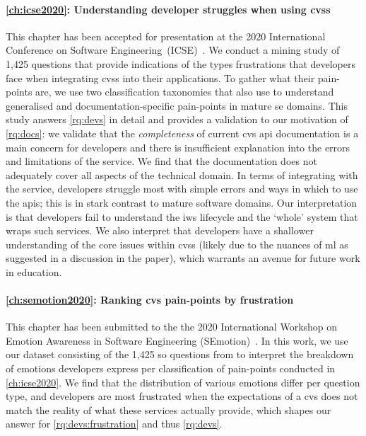 \paragraph{\cref{ch:icse2020}: Understanding developer struggles when using \glspl{cvs}} This chapter has been accepted for presentation at the 2020 International Conference on Software Engineering~(ICSE)~\citep{Cummaudo:2020icse}. We conduct a mining study of 1,425  questions that provide indications of the types frustrations that developers face when integrating \glspl{cvs} into their applications. To gather what their pain-points are, we use two classification taxonomies that also use  to understand generalised and documentation-specific pain-points in mature \gls{se} domains. This study answers \ref{rq:devs} in detail and provides a validation to our motivation of \ref{rq:docs}: we validate that the \textit{completeness} of current \gls{cvs} \gls{api} documentation is a main concern for developers and there is insufficient explanation into the errors and limitations of the service. We find that the documentation does not adequately cover all aspects of the technical domain. In terms of integrating with the service, developers struggle most with simple errors and ways in which to use the \glspl{api}; this is in stark contrast to mature software domains. Our interpretation is that developers fail to understand the \gls{iws} lifecycle and the `whole' system that wraps such services. We also interpret that developers have a shallower understanding of the core issues within \glspl{cvs} (likely due to the nuances of \gls{ml} as suggested in a discussion in the paper), which warrants an avenue for future work in  education.

\paragraph{\cref{ch:semotion2020}: Ranking \gls{cvs} pain-points by frustration} This chapter has been submitted to the the 2020 International Workshop on Emotion Awareness in Software Engineering (SEmotion)~\citep{Curumsing:2020semotion}. In this work, we use our dataset consisting of the 1,425 \gls{so} questions from \citep{Cummaudo:2020icse} to interpret the breakdown of emotions developers express per classification of pain-points conducted in \cref{ch:icse2020}. We find that the distribution of various emotions differ per question type, and developers are most frustrated when the expectations of a \gls{cvs} does not match the reality of what these services actually provide, which shapes our answer for \ref{rq:devs:frustration} and thus \ref{rq:devs}.

